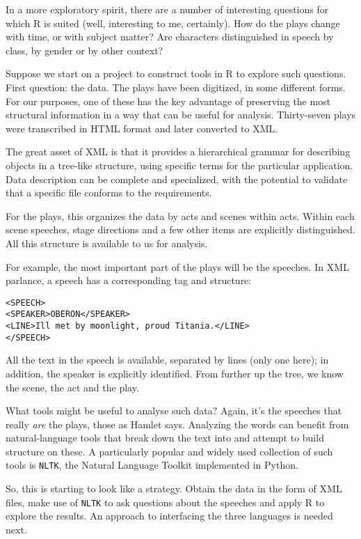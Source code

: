 \documentclass{article}
\begin{document}
In a more exploratory spirit, there are a number of interesting
questions for which R is suited (well, interesting to me, certainly).
How do the plays change with time, or with subject matter? Are
characters distinguished in speech by class, by gender or by other
context?

Suppose we start on a project to construct tools in R to explore such
questions. First question: the data. The plays have been digitized, in
some different forms. For our purposes, one of these has the key
advantage of preserving the most structural information in a way that
can be useful for analysis. Thirty-seven plays were transcribed in
HTML format and later converted to XML.

The great asset of XML is that it provides a hierarchical grammar for
describing objects in a tree-like structure, using specific terms for
the particular application.
Data description can be complete and specialized, with the potential
to validate that a specific file  conforms to the requirements.

For the plays, this organizes the data by acts
and scenes within acts. Within each scene speeches, stage directions and a few
other items are explicitly distinguished. All this structure is
available to us for analysis.

For example, the most important part of the plays will be the
speeches.  In XML parlance, a speech has a corresponding tag and
structure:

\begin{verbatim}
<SPEECH>
<SPEAKER>OBERON</SPEAKER>
<LINE>Ill met by moonlight, proud Titania.</LINE>
</SPEECH>
\end{verbatim}

All the text in the speech is available, separated by lines (only one
here); in addition, the speaker is explicitly identified. From further
up the tree, we know the scene, the act and the play.

What tools might be useful to analyse such data? Again, it's the
speeches that really \emph{are} the plays, those  as Hamlet says. Analyzing the words can benefit from
natural-language tools that break down the text into  and
attempt to build structure on these. A particularly popular and widely
used collection of such tools is \texttt{NLTK}, the Natural Language
Toolkit implemented in Python.

So, this is starting to look like a strategy. Obtain the data in the
form of XML files, make use of \texttt{NLTK} to ask questions about
the speeches and apply R to explore the results. An approach to
interfacing the three languages is needed next.
\end{document}
